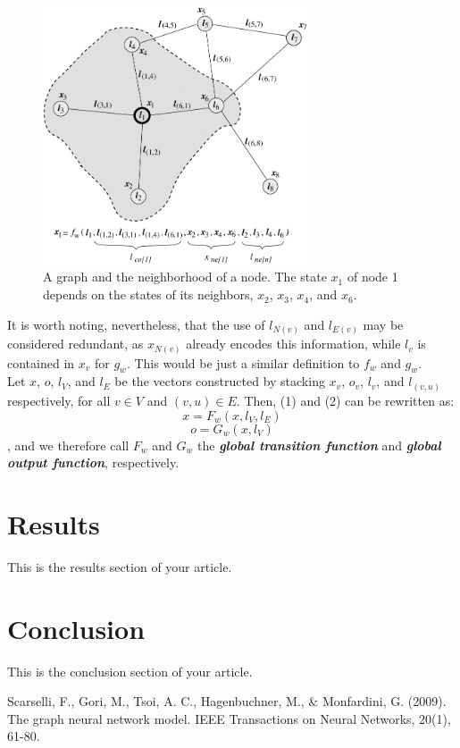 \documentclass[12pt]{article}
\begin{document}
    \begin{figure}[h]
        \centering
        \includegraphics[width=0.7\textwidth]{img/A-graph-and-the-neighborhood-of-a-node-The-state-x-1-of-node-1-depends-on-the.png}
        \caption{A graph and the neighborhood of a node. The state $x_1$ of node 1 depends on the states of its neighbors, $x_2$, $x_3$, $x_4$, and $x_6$.}
        \label{fig:local_functions}
    \end{figure}

    \indent It is worth noting, nevertheless, that the use of $l_{N(v)}$ and $l_{E(v)}$ may be considered redundant,
    as $x_{N(v)}$ already encodes this information, while $l_v$ is contained in $x_v$ for $g_w$. This would be just a similar
    definition to $f_w$ and $g_w$.
    \\
    \indent Let $x$, $o$, $l_V$, and $l_E$ be the vectors constructed by stacking $x_v$, $o_v$, $l_v$, and $l_{(v, u)}$ respectively, for all $v \in V$
    and $(v, u) \in E$.
    Then, (1) and (2) can be rewritten as:
    \begin{equation}
        x = F_w(x, l_V, l_E)
    \end{equation}
    \begin{equation}
        o = G_w(x, l_V)
    \end{equation}
    , and we therefore call $F_w$ and $G_w$ the \textbf{\textit{global transition function}} and \textbf{\textit{global output function}}, respectively.


    

\section{Results}
This is the results section of your article.

\section{Conclusion}
This is the conclusion section of your article.

\begin{thebibliography}{9}
Scarselli, F., Gori, M., Tsoi, A. C., Hagenbuchner, M., \& Monfardini, G. (2009). The graph neural network model. IEEE Transactions on Neural Networks, 20(1), 61-80.

\end{thebibliography}
\end{document}
